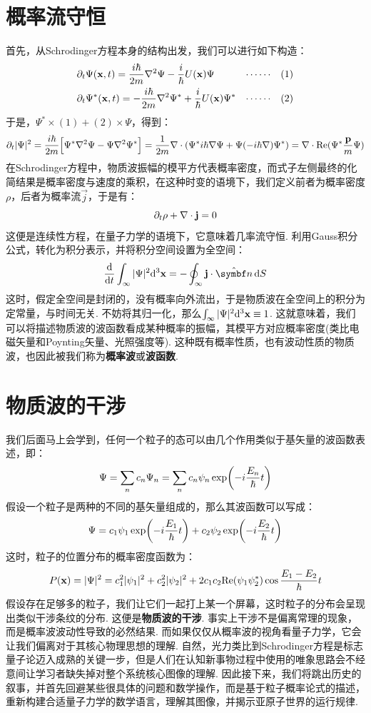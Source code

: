 \section{概率流守恒}
首先，从Schrodinger方程本身的结构出发，我们可以进行如下构造：
\begin{align*}
& \partial_{t}\Psi(\mathbf{x},t) = \frac{i\hbar}{2m}\nabla^2\Psi -\frac{i}{\hbar}U({\mathbf{x}})\Psi &\cdots\cdots &&(1) \\
& \partial_{t}\Psi^{*}(\mathbf{x},t) = -\frac{i\hbar}{2m}\nabla^2\Psi^{*} + \frac{i}{\hbar}U(\mathbf{x})\Psi^{*}& \cdots\cdots && (2)
\end{align*}
于是，\(\Psi^{*}\times(1) + (2)\times\Psi\)，得到：
\[
\partial_{t}|\Psi|^{2} = \frac{i\hbar}{2m}\Big[\Psi^{*}\nabla^2\Psi - \Psi\nabla^2\Psi^{*}\Big] = \frac{1}{2m}\nabla\cdot(\Psi^{*}i\hbar\nabla\Psi + \Psi(-i\hbar\nabla)\Psi^{*}) = \nabla\cdot\mathrm{Re}(\Psi^{*}\frac{\mathbf{p}}{m}\Psi)
\]
在Schrodinger方程中，物质波振幅的模平方代表概率密度，而式子左侧最终的化简结果是概率密度与速度的乘积，在这种时变的语境下，我们定义前者为概率密度\(\rho\)，后者为概率流\(\vec{j}\)，于是有：
\[
\partial_{t}\rho + \nabla\cdot\mathbf{j} = 0
\]
这便是连续性方程，在量子力学的语境下，它意味着几率流守恒. 利用Gauss积分公式，转化为积分表示，并将积分空间设置为全空间：
\[
\dt{}\int_{\infty}|\Psi|^{2}\dd^3\vr = -\oint_{\infty}\vj\cdot\uv{n}\dd{S}
\]
这时，假定全空间是封闭的，没有概率向外流出，于是物质波在全空间上的积分为定常量，与时间无关. 不妨将其归一化，那么\(\int_{\infty}|\Psi|^{2}\dd^3\mathbf{x}\equiv1\). 这就意味着，我们可以将描述物质波的波函数看成某种概率的振幅，其模平方对应概率密度(类比电磁矢量和Poynting矢量、光照强度等). 这种既有概率性质，也有波动性质的物质波，也因此被我们称为\textbf{概率波}或\textbf{波函数}. 
\section{物质波的干涉}
我们后面马上会学到，任何一个粒子的态可以由几个作用类似于基矢量的波函数表述，即：
\[
\Psi = \sum_{n}c_{n}\Psi_{n} = \sum_{n}c_{n}\psi_{n}\exp(-i\frac{E_{n}}{\hbar}t)
\]
假设一个粒子是两种的不同的基矢量组成的，那么其波函数可以写成：
\[
\Psi = c_{1}\psi_{1}\exp(-i\frac{E_{1}}{\hbar}t) + c_{2}\psi_{2}\exp(-i\frac{E_{2}}{\hbar}t)
\]
这时，粒子的位置分布的概率密度函数为：
\[
P(\mathbf{x}) = |\Psi|^{2} = c_{1}^{2}|\psi_{1}|^{2} + c_{2}^2|\psi_{2}|^{2} + 2c_{1}c_{2}\mathrm{Re}(\psi_{1}\psi_{2}^{*})\cos\frac{E_{1}-E_{2}}{\hbar}t
\]
假设存在足够多的粒子，我们让它们一起打上某一个屏幕，这时粒子的分布会呈现出类似干涉条纹的分布. 这便是\textbf{物质波的干涉}. 事实上干涉不是偏离常理的现象，而是概率波波动性导致的必然结果. 而如果仅仅从概率波的视角看量子力学，它会让我们偏离对于其核心物理思想的理解. 自然，光力类比到Schrodinger方程是标志量子论迈入成熟的关键一步，但是人们在认知新事物过程中使用的唯象思路会不经意间让学习者缺失掉对整个系统核心图像的理解. 因此接下来，我们将跳出历史的叙事，并首先回避某些很具体的问题和数学操作，而是基于粒子概率论式的描述，重新构建合适量子力学的数学语言，理解其图像，并揭示亚原子世界的运行规律.  
